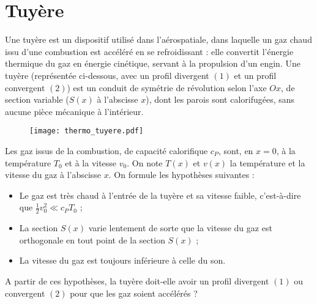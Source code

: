 \newpage

\section{Tuyère}

Une tuyère est un dispositif utilisé dans l'aérospatiale, dans laquelle un gaz chaud issu d'une combustion est accéléré en se refroidissant : elle convertit l'énergie thermique du gaz en énergie cinétique, servant à la propulsion d'un engin. Une tuyère (représentée ci-dessous, avec un profil divergent $(1)$ et un profil convergent $(2)$) est un conduit de symétrie de révolution selon l'axe $Ox$, de section variable ($S(x)$ à l'abscisse $x$), dont les parois sont calorifugées, sans aucune pièce mécanique à l'intérieur.

\begin{figure}[!h]
\centering
	\texttt{[image: thermo\_tuyere.pdf]}
\end{figure}

Les gaz issus de la combustion, de capacité calorifique $c_P$, sont, en $x=0$, à la température $T_0$ et à la vitesse $v_0$. On note $T(x)$ et $v(x)$ la température et la vitesse du gaz à l'abscisse $x$. On formule les hypothèses suivantes :
\begin{itemize}
	\item Le gaz est très chaud à l'entrée de la tuyère et sa vitesse faible, c'est-à-dire que $\frac{1}{2}v_0^2\ll c_PT_0$ ; 
	\item La section $S(x)$ varie lentement de sorte que la vitesse du gaz est orthogonale en tout point de la section $S(x)$ ;
	\item La vitesse du gaz est toujours inférieure à celle du son.
\end{itemize}

\vspace{1cm}

A partir de ces hypothèses, la tuyère doit-elle avoir un profil divergent $(1)$ ou convergent $(2)$ pour que les gaz soient accélérés ?

\newpage

